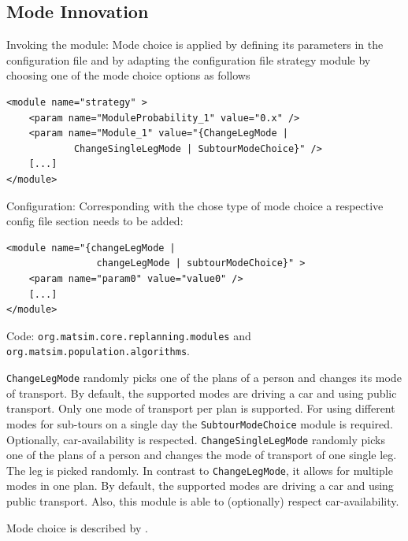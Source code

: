 \subsection{Mode Innovation}
\label{sec:modechoice}
\begin{compactitem}
\item Invoking the module: Mode choice is applied by defining its parameters in the configuration file and by adapting the configuration file strategy module by choosing one of the mode choice options as follows
\begin{lstlisting}
<module name="strategy" >
    <param name="ModuleProbability_1" value="0.x" />
    <param name="Module_1" value="{ChangeLegMode |
    		ChangeSingleLegMode | SubtourModeChoice}" />
    [...]
</module>
\end{lstlisting}
%
\item Configuration: Corresponding with the chose type of mode choice a respective config file section needs to be added:
%
\begin{lstlisting}
<module name="{changeLegMode |
				changeLegMode | subtourModeChoice}" >
    <param name="param0" value="value0" />
    [...]
</module>
\end{lstlisting}
%
\item Code: \lstinline|org.matsim.core.replanning.modules| and \lstinline|org.matsim.population.algorithms|.
\end{compactitem}

\lstinline|ChangeLegMode| randomly picks one of the plans of a person and changes its mode of transport. By default, the supported modes are driving a car and using public transport. Only one mode of transport per plan is supported. For using different modes for sub-tours on a single day the \lstinline|SubtourModeChoice| module is required. Optionally, car-availability is respected. \lstinline|ChangeSingleLegMode| randomly picks one of the plans of a person and changes the mode of transport of one single leg. The leg is picked randomly. In contrast to \lstinline|ChangeLegMode|, it allows for multiple modes in one plan. By default, the supported modes are driving a car and using public transport. Also, this module is able to (optionally) respect car-availability.

Mode choice is described by \citet[][]{RieserEtAl_TRR_2009, MeisterEtAl_WCTRS_2010, CiariEtAl_STRC_2008, CiariEtAl_STRC_2007}.

